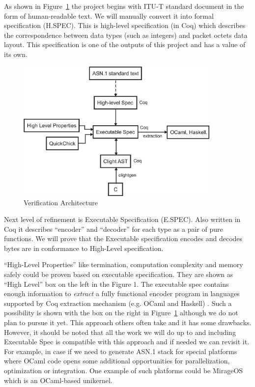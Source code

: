 \documentclass[acmsmall,nonacm]{acmart}
\begin{document}
As shown in Figure~\ref{fig:components} the project begins with ITU-T
standard document in the form of human-readable text. We will manually
convert it into formal specification (H.SPEC). This is high-level
specification (in Coq) which describes the correspondence between data
types (such as integers) and packet octets data layout. This
specification is one of the outputs of this project and has a value of
its own.

\begin{figure}[h!]
  \centering
  \includegraphics[width=10cm]{VerificationArchitectureDiagram.eps}
  \caption{Verification Architecture}
  \label{fig:components}
\end{figure}

Next level of refinement is Executable Specification (E.SPEC). Also
written in Coq it describes ``encoder'' and ``decoder'' for each type
as a pair of pure functions. We will prove that the Executable
specification encodes and decodes bytes are in conformance to High-Level
specification.

``High-Level Properties'' like termination, computation complexity and
memory safely could be proven based on executable specification. They
are shown as ``High Level'' box on the left in the Figure 1. The executable spec
contains enough information to \textit{extract} a fully functional
encoder program in languages supported by Coq extraction mechanism
(e.g. OCaml and Haskell) \cite{Extraction}. Such a possibility is shown with the box
on the right in Figure~\ref{fig:components} although we do not plan to
pursue it yet. This approach others often take and it has some
drawbacks. However, it should be noted that all the work we will do up
to and including Executable Spec is compatible with this approach and
if needed we can revisit it. For example, in case if we need to
generate ASN.1 stack for special platforms where OCaml code opens some
additional opportunities for parallelization, optimization or
integration. One example of such platforms could be MirageOS
\cite{MirageOS} which is an OCaml-based unikernel.
\end{document}
